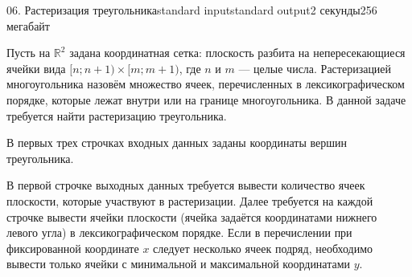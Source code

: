 \begin{problem}{06. Растеризация треугольника}{standard input}{standard output}{2 секунды}{256 мегабайт}

Пусть на $\mathbb R^2$ задана координатная сетка: плоскость разбита на непересекающиеся ячейки вида $[n; n + 1) \times [m; m + 1)$, где $n$ и $m$ --- целые числа. Растеризацией многоугольника назовём множество ячеек, перечисленных в лексикографическом порядке, которые лежат внутри или на границе многоугольника. В данной задаче требуется найти растеризацию треугольника.

\InputFile

В первых трех строчках входных данных заданы координаты вершин треугольника.

\OutputFile

В первой строчке выходных данных требуется вывести количество ячеек плоскости, которые участвуют в растеризации. Далее требуется на каждой строчке вывести ячейки плоскости (ячейка задаётся координатами нижнего левого угла) в лексикографическом порядке. Если в перечислении при фиксированной координате $x$ следует несколько ячеек подряд, необходимо вывести только ячейки с минимальной и максимальной координатами $y$.

\Examples

\begin{example}%
%
\end{example}

\end{problem}
